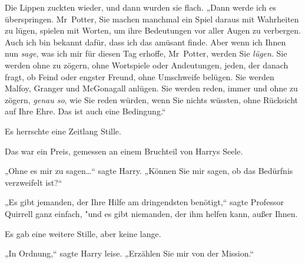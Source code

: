 Die Lippen zuckten wieder, und dann wurden sie flach. „Dann werde ich es überspringen. Mr~Potter, Sie machen manchmal ein Spiel daraus mit Wahrheiten zu lügen, spielen mit Worten, um ihre Bedeutungen vor aller Augen zu verbergen. Auch ich bin bekannt dafür, dass ich das amüsant finde. Aber wenn ich Ihnen nun \emph{sage}, was ich mir für diesen Tag erhoffe, Mr~Potter, werden Sie \emph{lügen}. Sie werden ohne zu zögern, ohne Wortspiele oder Andeutungen, jeden, der danach fragt, ob Feind oder engster Freund, ohne Umschweife belügen. Sie werden Malfoy, Granger und McGonagall anlügen. Sie werden reden, immer und ohne zu zögern, \emph{genau so}, wie Sie reden würden, wenn Sie nichts wüssten, ohne Rücksicht auf Ihre Ehre. Das ist auch eine Bedingung.“

Es herrschte eine Zeitlang Stille.

Das war ein Preis, gemessen an einem Bruchteil von Harrys Seele.

„Ohne es mir zu sagen…“ sagte Harry. „Können Sie mir sagen, ob das Bedürfnis verzweifelt ist?“

„Es gibt jemanden, der Ihre Hilfe am dringendsten benötigt,“ sagte Professor Quirrell ganz einfach, "und es gibt niemanden, der ihm helfen kann, außer Ihnen.

Es gab eine weitere Stille, aber keine lange.

„In Ordnung,“ sagte Harry leise. „Erzählen Sie mir von der Mission.“

